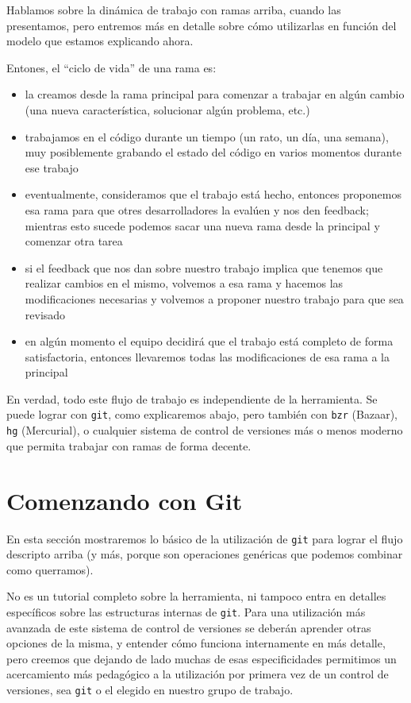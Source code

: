 Hablamos sobre la dinámica de trabajo con ramas arriba, cuando las presentamos, pero entremos más en detalle sobre cómo utilizarlas en función del modelo que estamos explicando ahora.

Entones, el ``ciclo de vida'' de una rama es:

\begin{itemize}
  \item la creamos desde la rama principal para comenzar a trabajar en algún cambio (una nueva característica, solucionar algún problema, etc.)

  \item trabajamos en el código durante un tiempo (un rato, un día, una semana), muy posiblemente grabando el estado del código en varios momentos durante ese trabajo

  \item eventualmente, consideramos que el trabajo está hecho, entonces proponemos esa rama para que otres desarrolladores la evalúen y nos den feedback; mientras esto sucede podemos sacar una nueva rama desde la principal y comenzar otra tarea

  \item si el feedback que nos dan sobre nuestro trabajo implica que tenemos que realizar cambios en el mismo, volvemos a esa rama y hacemos las modificaciones necesarias y volvemos a proponer nuestro trabajo para que sea revisado

  \item en algún momento el equipo decidirá que el trabajo está completo de forma satisfactoria, entonces llevaremos todas las modificaciones de esa rama a la principal
\end{itemize}

En verdad, todo este flujo de trabajo es independiente de la herramienta. Se puede lograr con \texttt{git}, como explicaremos abajo, pero también con \texttt{bzr} (Bazaar), \texttt{hg} (Mercurial), o cualquier sistema de control de versiones más o menos moderno que permita trabajar con ramas de forma decente.

\section{Comenzando con Git}

En esta sección mostraremos lo básico de la utilización de \texttt{git} para lograr el flujo descripto arriba (y más, porque son operaciones genéricas que podemos combinar como querramos).

No es un tutorial completo sobre la herramienta, ni tampoco entra en detalles específicos sobre las estructuras internas de \texttt{git}. Para una utilización más avanzada de este sistema de control de versiones se deberán aprender otras opciones de la misma, y entender cómo funciona internamente en más detalle, pero creemos que dejando de lado muchas de esas especificidades permitimos un acercamiento más pedagógico a la utilización por primera vez de un control de versiones, sea \texttt{git} o el elegido en nuestro grupo de trabajo.

